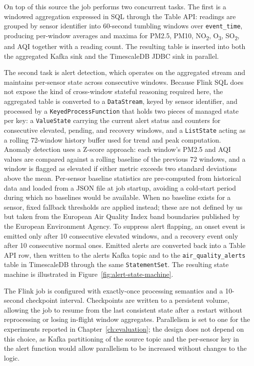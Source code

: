 On top of this source the job performs two concurrent tasks. The first is a windowed aggregation expressed in SQL through the Table API: readings are grouped by sensor identifier into 60-second tumbling windows over \texttt{event\_time}, producing per-window averages and maxima for PM2.5, PM10, NO\textsubscript{2}, O\textsubscript{3}, SO\textsubscript{2}, and AQI together with a reading count. The resulting table is inserted into both the aggregated Kafka sink and the TimescaleDB JDBC sink in parallel.

The second task is alert detection, which operates on the aggregated stream and maintains per-sensor state across consecutive windows. Because Flink SQL does not expose the kind of cross-window stateful reasoning required here, the aggregated table is converted to a \texttt{DataStream}, keyed by sensor identifier, and processed by a \texttt{KeyedProcessFunction} that holds two pieces of managed state per key: a \texttt{ValueState} carrying the current alert status and counters for consecutive elevated, pending, and recovery windows, and a \texttt{ListState} acting as a rolling 72-window history buffer used for trend and peak computation. Anomaly detection uses a Z-score approach: each window's PM2.5 and AQI values are compared against a rolling baseline of the previous 72 windows, and a window is flagged as elevated if either metric exceeds two standard deviations above the mean. Per-sensor baseline statistics are pre-computed from historical data and loaded from a JSON file at job startup, avoiding a cold-start period during which no baselines would be available. When no baseline exists for a sensor, fixed fallback thresholds are applied instead; these are not defined by us but taken from the European Air Quality Index band boundaries published by the European Environment Agency\cite{eea_aqi}. To suppress alert flapping, an onset event is emitted only after 10 consecutive elevated windows, and a recovery event only after 10 consecutive normal ones. Emitted alerts are converted back into a Table API row, then written to the alerts Kafka topic and to the \texttt{air\_quality\_alerts} table in TimescaleDB through the same \texttt{StatementSet}. The resulting state machine is illustrated in Figure~\ref{fig:alert-state-machine}.

The Flink job is configured with exactly-once processing semantics and a 10-second checkpoint interval. Checkpoints are written to a persistent volume, allowing the job to resume from the last consistent state after a restart without reprocessing or losing in-flight window aggregates. Parallelism is set to one for the experiments reported in Chapter~\ref{ch:evaluation}; the design does not depend on this choice, as Kafka partitioning of the source topic and the per-sensor key in the alert function would allow parallelism to be increased without changes to the logic.

